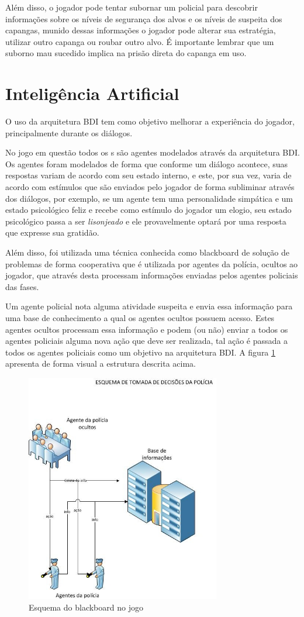 Além disso, o jogador pode tentar subornar um policial para descobrir informações sobre os níveis de segurança dos alvos e os níveis de suspeita dos capangas, munido dessas informações o jogador pode alterar sua estratégia, utilizar outro capanga ou roubar outro alvo. É importante lembrar que um suborno mau sucedido implica na prisão direta do capanga em uso.

\section{Inteligência Artificial}
O uso da arquitetura BDI tem como objetivo melhorar a experiência do jogador, principalmente durante os diálogos.

No jogo em questão todos os \npc{}s são agentes modelados através da arquitetura BDI. Os agentes foram modelados de forma que conforme um diálogo acontece, suas respostas variam de acordo com seu estado interno, e este, por sua vez, varia de acordo com estímulos que são enviados pelo jogador de forma subliminar através dos diálogos, por exemplo, se um agente tem uma personalidade simpática e um estado psicológico feliz e recebe como estímulo do jogador um elogio, seu estado psicológico passa a ser \emph{lisonjeado} e ele provavelmente optará por uma resposta que expresse sua gratidão.

Além disso, foi utilizada uma técnica conhecida como blackboard de solução de problemas de forma cooperativa que é utilizada por agentes da polícia, ocultos ao jogador, que através desta processam informações enviadas pelos agentes policiais das fases.

Um agente policial nota alguma atividade suspeita e envia essa informação para uma base de conhecimento a qual os agentes ocultos possuem acesso. Estes agentes ocultos processam essa informação e podem (ou não) enviar a todos os agentes policiais alguma nova ação que deve ser realizada, tal ação é passada a todos os agentes policiais como um objetivo na arquitetura BDI.
A figura \ref{blackboard_policia} apresenta de forma visual a estrutura descrita acima.
\begin{figure}
\centering
\includegraphics [height=10cm]{figuras/blackboard_policia.jpg}
\caption{Esquema do blackboard no jogo}
\label{blackboard_policia}
\end{figure}

